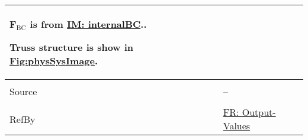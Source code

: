\documentclass[12pt]{article}
\begin{document}
\begin{minipage}{\textwidth}
\begin{tabular}{>{\raggedright}p{}>{\raggedright\arraybackslash}p{}}
        ${\mathbf{F}_{\text{BC}}}$ is from \hyperref[IM:internalBC]{IM: internalBC}..
        
        Truss structure is show in \hyperref[Figure:physSysImage]{Fig:physSysImage}.
        
\\ \midrule \\
Source & --
         
\\ \midrule \\
RefBy & \hyperref[outputValues]{FR: Output-Values}
        
\\ \bottomrule
\end{tabular}
\end{minipage}

\vspace{\baselineskip}
\noindent
\end{document}
